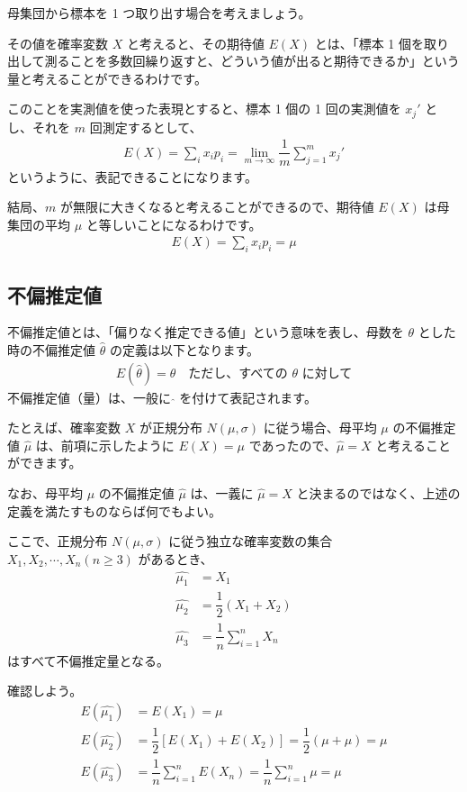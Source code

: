 \documentclass[uplatex,11pt,a4paper]{jsarticle}
\begin{document}
母集団から標本を 1 つ取り出す場合を考えましょう。

その値を確率変数 $X$ と考えると、その期待値 $E(X)$ とは、「標本 1 個を取り出して測ることを多数回繰り返すと、どういう値が出ると期待できるか」という量と考えることができるわけです。

このことを実測値を使った表現とすると、標本 1 個の 1 回の実測値を $x_j'$ とし、それを $m$ 回測定するとして、
\begin{align*}
	E(X)=\sum_i x_i p_i = \lim_{m \to \infty} \dfrac{1}{m} \sum_{j=1}^m x_j'
\end{align*}
というように、表記できることになります。

結局、$m$ が無限に大きくなると考えることができるので、期待値 $E(X)$ は母集団の平均 $\mu$ と等しいことになるわけです。
\begin{align*}
	E(X)=\sum_i x_i p_i = \mu
\end{align*}

\subsection{不偏推定値}

不偏推定値とは、「偏りなく推定できる値」という意味を表し、母数を $\theta$ とした時の不偏推定値 $\hat{\theta}$ の定義は以下となります。
\begin{align*}
	E(\hat{\theta}) = \theta \quad \text{ただし、すべての $\theta$ に対して}
\end{align*}
不偏推定値（量）は、一般に $\hat{}$ を付けて表記されます。

たとえば、確率変数 $X$ が正規分布 $N(\mu, \sigma)$ に従う場合、母平均 $\mu$ の不偏推定値 $\hat{\mu}$ は、前項に示したように $E(X) = \mu$ であったので、$\hat{\mu} = X$ と考えることができます。

なお、母平均 $\mu$ の不偏推定値 $\hat{\mu}$ は、一義に $\hat{\mu} = X$ と決まるのではなく、上述の定義を満たすものならば何でもよい。

ここで、正規分布 $N(\mu, \sigma)$ に従う独立な確率変数の集合 $X_1, X_2, \cdots, X_n (n\geq 3)$ があるとき、
\begin{align*}
\hat{\mu_1} &= X_1 \\
\hat{\mu_2} &= \dfrac{1}{2}(X_1 + X_2) \\
\hat{\mu_3} &= \dfrac{1}{n} \sum_{i=1}^n X_n
\end{align*}
はすべて不偏推定量となる。

確認しよう。
\begin{align*}
E(\hat{\mu_1}) &= E(X_1) = \mu \\
E(\hat{\mu_2}) &= \dfrac{1}{2}[E(X_1) + E(X_2) ]= \dfrac{1}{2} (\mu + \mu) = \mu \\
E(\hat{\mu_3}) &= \dfrac{1}{n} \sum_{i=1}^n E(X_n) = \dfrac{1}{n} \sum_{i=1}^n \mu  = \mu 
\end{align*}
\end{document}
